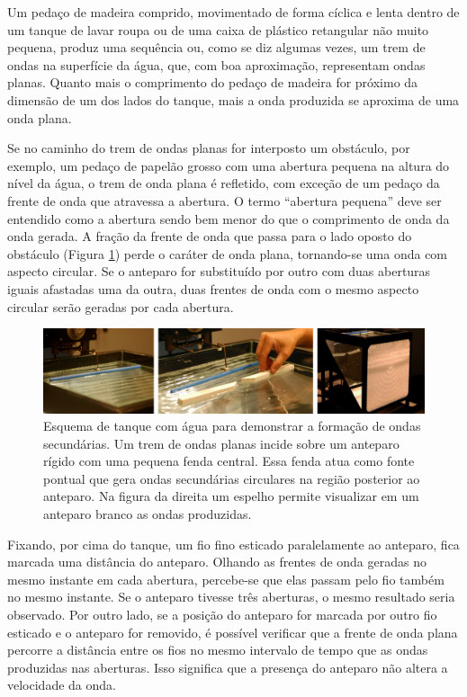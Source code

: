 \documentclass[]{book}
\theoremstyle{definition}
\theoremstyle{definition}
\theoremstyle{definition}
\theoremstyle{remark}
\begin{document}
Um pedaço de madeira comprido, movimentado de forma cíclica e lenta dentro de um tanque de lavar roupa ou de uma caixa de plástico retangular não muito pequena, produz uma sequência ou, como se diz algumas vezes, um trem de ondas na superfície da água, que, com boa aproximação, representam ondas planas. Quanto mais o comprimento do pedaço de madeira for próximo da dimensão de um dos lados do tanque, mais a onda produzida se aproxima de uma onda plana.

Se no caminho do trem de ondas planas for interposto um obstáculo, por exemplo, um pedaço de papelão grosso com uma abertura pequena na altura do nível da água, o trem de onda plana é refletido, com exceção de um pedaço da frente de onda que atravessa a abertura. O termo ``abertura pequena'' deve ser entendido como a abertura sendo bem menor do que o comprimento de onda da onda gerada. A fração da frente de onda que passa para o lado oposto do obstáculo (Figura \ref{fig:usp0401}) perde o caráter de onda plana, tornando-se uma onda com aspecto circular. Se o anteparo for substituído por outro com duas aberturas iguais afastadas uma da outra, duas frentes de onda com o mesmo aspecto circular serão geradas por cada abertura.

\begin{figure}

{\centering \includegraphics[width=0.8\linewidth]{fig/figU01} 

}

\caption{Esquema de tanque com água para demonstrar a formação de ondas secundárias. Um trem de ondas planas incide sobre um anteparo rígido com uma pequena fenda central. Essa fenda atua como fonte pontual que gera ondas secundárias circulares na região posterior ao anteparo. Na figura da direita um espelho permite visualizar em um anteparo branco as ondas produzidas.}\label{fig:usp0401}
\end{figure}

Fixando, por cima do tanque, um fio fino esticado paralelamente ao anteparo, fica marcada uma distância do anteparo. Olhando as frentes de onda geradas no mesmo instante em cada abertura, percebe-se que elas passam pelo fio também no mesmo instante. Se o anteparo tivesse três aberturas, o mesmo resultado seria observado. Por outro lado, se a posição do anteparo for marcada por outro fio esticado e o anteparo for removido, é possível verificar que a frente de onda plana percorre a distância entre os fios no mesmo intervalo de tempo que as ondas produzidas nas aberturas. Isso significa que a presença do anteparo não altera a velocidade da onda.
\end{document}
